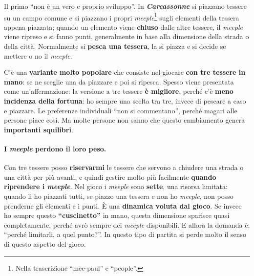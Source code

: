 

Il primo ``non è un vero e proprio sviluppo''. In \textbf{\emph{Carcassonne}} si piazzano
tessere su un campo comune e si piazzano i propri \emph{meeple}\footnote{Nella trascrizione
``mee-paul'' e ``people''.} sugli elementi della tessera appena piazzata; quando un elemento
viene \textbf{chiuso} dalle altre tessere, il \emph{meeple} viene ripreso e si fanno punti,
generalmente in base alla dimensione della strada o della città. Normalmente si
\textbf{pesca una tessera}, la si piazza e si decide se mettere o no il \emph{meeple}.

C'è una \textbf{variante molto popolare} che consiste nel giocare \textbf{con tre tessere in
mano}: se ne sceglie una da piazzare e poi si ripesca. Spesso viene presentata come
un'affermazione: la versione a tre tessere \textbf{è migliore}, perché c'è \textbf{meno
incidenza della fortuna}: ho sempre una scelta tra tre, invece di pescare a caso e piazzare.
Le preferenze individuali ``non si commentano'', perché magari alle persone piace così. Ma molte
persone non sanno che questo cambiamento genera \textbf{importanti squilibri}.

\paragraph{I \emph{meeple} perdono il loro peso.} Con tre tessere posso \textbf{riservarmi} le
tessere che servono a chiudere una strada o una città per più avanti, e quindi gestire molto
più facilmente \textbf{quando riprendere i \emph{meeple}}. Nel gioco i \emph{meeple} sono
\textbf{sette}, una risorsa limitata: quando li ho piazzati tutti, se piazzo una tessera e non ho
\emph{meeple}, non posso prenderne gli elementi e i punti. È una \textbf{dinamica voluta dal
gioco}. Se invece ho sempre questo \textbf{``cuscinetto''} in mano, questa dimensione sparisce
quasi completamente, perché avrò sempre dei \emph{meeple} disponibili. E allora la domanda è:
``perché limitarli, a quel punto?''. In questo tipo di partita si perde molto il senso di
questo aspetto del gioco.

